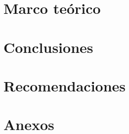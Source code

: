 \documentclass[11pt, letterpaper, twoside, openright]{report}
\newcommand{\defaultparformat}[1]{
	{\setlength{\parskip}{2ex}
     }
}
\begin{document}
\ifdefined\CAPmarcoteorico
	\newpage
	\chapter{Marco teórico}
	\ifdefined\parpordefecto
		\defaultparformat{var/agent_runs/teoria-visual-v2/i-marco-ampliado}
	\else
		
	\fi
\fi

\newpage
\ifdefined\parpordefecto
	\defaultparformat{j-capitulos}
\else
	
\fi

\ifdefined\CAPconclusiones
	\newpage
	\chapter{Conclusiones}
	\ifdefined\parpordefecto
		\defaultparformat{k-conclusiones}
	\else
		
	\fi
\fi

\ifdefined\CAPrecomendaciones
	\newpage
	\chapter{Recomendaciones}
	\ifdefined\parpordefecto
		\defaultparformat{l-recomendaciones}
	\else
		
	\fi
\fi

\ifdefined\CAPbibliografia
	\newpage
    \cleardoublepage{}
	\chapter{\bibname}
    \printbibliography[heading=none]
\fi

\ifdefined\CAPanexos
	\newpage
	\chapter{Anexos}
	\ifdefined\parpordefecto
		\defaultparformat{n-anexos}
	\else
		
	\fi
\fi

\ifdefined\CAPglosario
	\newpage
	\printglossary
\fi
\end{document}
